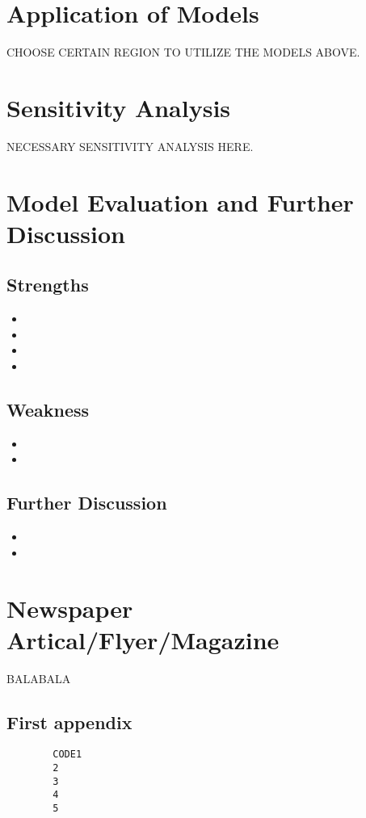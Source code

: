 \documentclass{mcmthesis}
\begin{document}
\section{Application of Models}
CHOOSE CERTAIN REGION TO UTILIZE THE MODELS ABOVE.

\section{Sensitivity Analysis}
NECESSARY SENSITIVITY ANALYSIS HERE.

\section{Model Evaluation and Further Discussion}
\subsection{Strengths}
\begin{itemize}
	\item
	\item
	\item
	\item
\end{itemize}
\subsection{Weakness}
\begin{itemize}
	\item
	\item
\end{itemize}
\subsection{Further Discussion}
\begin{itemize}
	\item
	\item
\end{itemize}

\section{Newspaper Artical/Flyer/Magazine}
BALABALA

\newpage
\newpage
\begin{thebibliography}{99}
\end{thebibliography}

\newpage
\newpage

\newpage
\newpage
\begin{appendices}
	\section{First appendix}
	\begin{lstlisting}
		CODE1
		2
		3
		4
		5
	\end{lstlisting}
\end{appendices}
\end{document}
